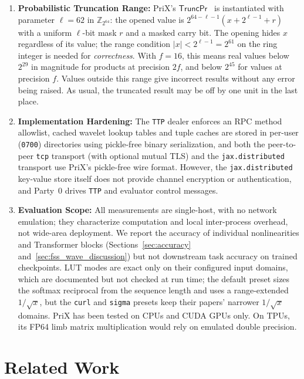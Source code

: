\documentclass[11pt]{article}
\newcommand{\Zring}{\mathbb{Z}_{2^{64}}}
\begin{document}
\begin{enumerate}
    \item \textbf{Probabilistic Truncation Range:} PriX's $\mathsf{TruncPr}$~\cite{escudero2020improved} is instantiated with parameter $\ell = 62$ in $\Zring$: the opened value is $2^{64-\ell-1}(x + 2^{\ell-1} + r)$ with a uniform $\ell$-bit mask $r$ and a masked carry bit. The opening hides $x$ regardless of its value; the range condition $|x| < 2^{\ell-1} = 2^{61}$ on the ring integer is needed for \emph{correctness}. With $f = 16$, this means real values below $2^{29}$ in magnitude for products at precision $2f$, and below $2^{45}$ for values at precision $f$. Values outside this range give incorrect results without any error being raised. As usual, the truncated result may be off by one unit in the last place.
    \item \textbf{Implementation Hardening:} The \texttt{TTP} dealer enforces an RPC method allowlist, cached wavelet lookup tables and tuple caches are stored in per-user (\texttt{0700}) directories using pickle-free binary serialization, and both the peer-to-peer \texttt{tcp} transport (with optional mutual TLS) and the \texttt{jax.distributed} transport use PriX's pickle-free wire format. However, the \texttt{jax.distributed} key-value store itself does not provide channel encryption or authentication, and Party~0 drives \texttt{TTP} and evaluator control messages.
    \item \textbf{Evaluation Scope:} All measurements are single-host, with no network emulation; they characterize computation and local inter-process overhead, not wide-area deployment. We report the accuracy of individual nonlinearities and Transformer blocks (Sections~\ref{sec:accuracy} and~\ref{sec:fss_wave_discussion}) but not downstream task accuracy on trained checkpoints. LUT modes are exact only on their configured input domains, which are documented but not checked at run time; the default preset sizes the softmax reciprocal from the sequence length and uses a range-extended $1/\sqrt{x}$, but the \texttt{curl} and \texttt{sigma} presets keep their papers' narrower $1/\sqrt{x}$ domains. PriX has been tested on CPUs and CUDA GPUs only. On TPUs, its FP64 limb matrix multiplication would rely on emulated double precision.
\end{enumerate}

\section{Related Work}
\label{sec:related}
\end{document}
